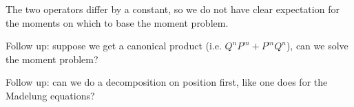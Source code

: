\documentclass[11pt]{article}
\begin{document}
The two operators differ by a constant, so we do not have clear expectation for the moments on which to base the moment problem.

Follow up: suppose we get a canonical product (i.e. $Q^nP^m + P^mQ^n$), can we solve the moment problem?

Follow up: can we do a decomposition on position first, like one does for the Madelung equations?

\end{document}
